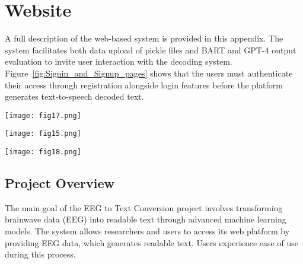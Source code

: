 \documentclass[journal]{IEEEtran}
\begin{document}
\section{Website}
A full description of the web-based system is provided in this appendix. The system facilitates both data upload of pickle files and BART and GPT-4 output evaluation to invite user interaction with the decoding system. Figure~\ref{fig:Signin_and_Signup_pages} shows that the users must authenticate their access through registration alongside login features before the platform generates text-to-speech decoded text.

\begin{figure*}[!t]
	\renewcommand{\arraystretch}{1.3}
	\centering
	\caption{Signin and Signup pages}
	\label{fig:Signin_and_Signup_pages}
	\texttt{[image: fig17.png]} 
	\vspace{-10pt} %
\end{figure*}
\begin{figure*}[!t]
	\renewcommand{\arraystretch}{1.3}
	\centering
	\caption{Submit page that used to upload the pickel file}
	\label{fig:submit_page}
	\texttt{[image: fig15.png]} 
	\vspace{-10pt} %
\end{figure*}

\begin{figure*}[!t]
	\renewcommand{\arraystretch}{1.3}
	\centering
	\caption{Predicted and Refined string page and contain the audio files}
	\label{fig:audio_page}
	\texttt{[image: fig18.png]} 
	\vspace{-10pt} %
\end{figure*}
\subsection{Project Overview}
The main goal of the EEG to Text Conversion project involves transforming brainwave data (EEG) into readable text through advanced machine learning models. The system allows researchers and users to access its web platform by providing EEG data, which generates readable text. Users experience ease of use during this process.
\end{document}
